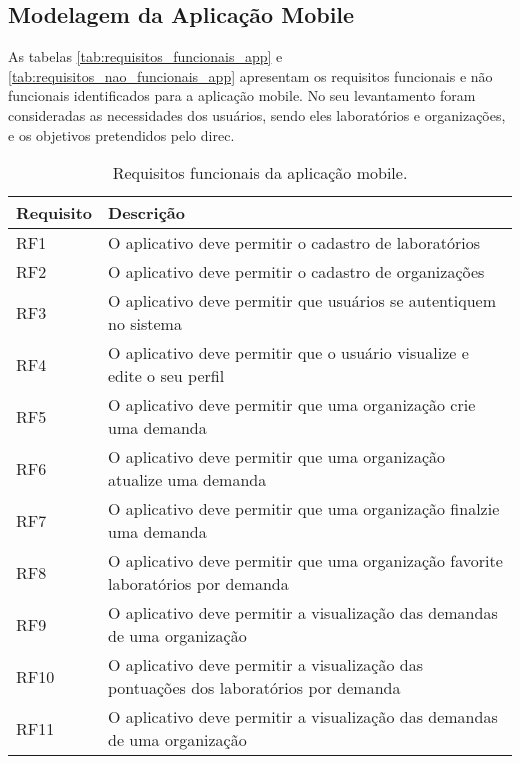 \subsection{Modelagem da Aplicação Mobile}\label{subsec:modelagem_app}

As tabelas \autoref{tab:requisitos_funcionais_app} e \autoref{tab:requisitos_nao_funcionais_app} apresentam os requisitos funcionais e não funcionais identificados para a aplicação mobile. No seu levantamento foram consideradas as necessidades dos usuários, sendo eles laboratórios e organizações, e os objetivos pretendidos pelo \gls{direc}.

\begin{table}[H]
  \caption{Requisitos funcionais da aplicação mobile.}
  \label{tab:requisitos_funcionais_app}
  \begin{tabularx}{\textwidth}{l|l}
    \hline
    \textbf{Requisito} & \textbf{Descrição}                                                                    \\ \hline
    RF1                & O aplicativo deve permitir o cadastro de laboratórios                                 \\
    RF2                & O aplicativo deve permitir o cadastro de organizações                                 \\
    RF3                & O aplicativo deve permitir que usuários se autentiquem no sistema                     \\
    RF4                & O aplicativo deve permitir que o usuário visualize e edite o seu perfil               \\
    RF5                & O aplicativo deve permitir que uma organização crie uma demanda                       \\
    RF6                & O aplicativo deve permitir que uma organização atualize uma demanda                   \\
    RF7                & O aplicativo deve permitir que uma organização finalzie uma demanda                   \\
    RF8                & O aplicativo deve permitir que uma organização favorite laboratórios por demanda      \\
    RF9                & O aplicativo deve permitir a visualização das demandas de uma organização             \\
    RF10               & O aplicativo deve permitir a visualização das pontuações dos laboratórios por demanda \\
    RF11               & O aplicativo deve permitir a visualização das demandas de uma organização             \\ \hline
  \end{tabularx}
  \fonte{}
\end{table}

